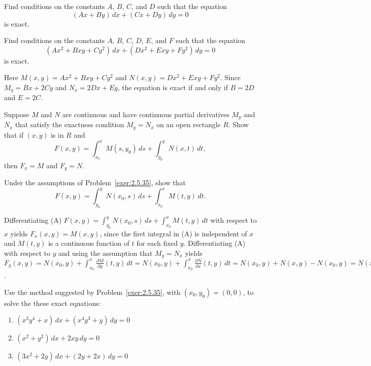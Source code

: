 \documentclass{ximera}
\begin{document}
\begin{problem}\label{exer:2.5.33}
Find conditions on the constants $A$, $B$, $C$, and $D$ such that
the equation
$$
(Ax+By)\,dx+(Cx+Dy)\,dy=0
$$
is exact.
\end{problem}

\begin{problem}\label{exer:2.5.34}
Find conditions on the constants $A$, $B$, $C$, $D$, $E$, and
$F$ such that the equation
$$
(Ax^2+Bxy+Cy^2)\,dx+(Dx^2+Exy+Fy^2)\,dy=0
$$
is exact.



\begin{solution}
    Here $M(x,y)=Ax^2+Bxy+Cy^2$ and
$N(x,y)=Dx^2+Exy+Fy^2$. Since $M_y=Bx+2Cy$ and $N_x=2Dx+Ey$, the
equation is exact if and only if $B=2D$ and $E=2C$.
\end{solution}
\end{problem}

\begin{problem}\label{exer:2.5.35}
Suppose $M$ and $N$ are continuous and have continuous partial
derivatives $M_y$ and $N_x$ that satisfy the exactness condition
$M_y=N_x$ on an open rectangle $R$.
  Show that if $(x,y)$ is in $R$ and
$$
F(x,y)=\int^x_{x_0}M(s,y_0)\,ds+\int^y_{y_0}N(x,t)\,dt,
$$
then $F_x=M$ and $F_y=N$.
\end{problem}

\begin{problem}\label{exer:2.5.36}
Under the assumptions of Problem~\ref{exer:2.5.35}, show that
$$
F(x,y)=\int^y_{y_0}N(x_0,s)\,ds+\int^x_{x_0}M(t,y)\,dt.
$$



\begin{solution}
    Differentiating (A)
$F(x,y)=\int^y_{y_0}N(x_0,s)\,ds+\int^x_{x_0}M(t,y)\,dt$
with respect to $x$ yields $F_x(x,y)=M(x,y)$, since the first
integral
in (A) is independent of $x$ and $M(t,y)$ is a continuous function
of
$t$ for each fixed $y$. Differentiating  (A)  with respect to $y$
and using the assumption that $M_y=N_x$ yields
$F_y(x,y)=N(x_0,y)+\int^x_{x_0}\frac{\partial M}{\partial y}(t,y)\,dt
=N(x_0,y)+\int^x_{x_0}\frac{\partial N}{\partial x} (t,y)\,dt
=N(x_0,y)+N(x,y)-N(x_0,y)=N(x,y)$.
\end{solution}
\end{problem}

\begin{problem}\label{exer:2.5.37}
Use the method suggested by Problem~\ref{exer:2.5.35}, with
$(x_0,y_0)=(0,0)$, to solve the these exact equations:
\begin{enumerate}
\item %
$(x^3y^4+x)\,dx+(x^4y^3+y)\,dy=0$
\item %
$(x^2+y^2)\,dx+2xy\,dy=0$
\item %
$(3x^2+2y)\,dx+(2y+2x)\,dy=0$
\end{enumerate}
\end{problem}
\end{document}
